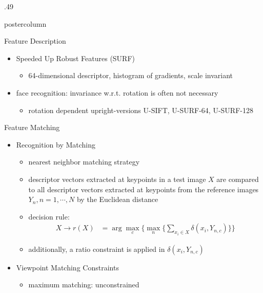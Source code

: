 \documentclass[final,hyperref={pdfpagelabels=false}]{beamer}
\begin{document}
\begin{frame}
\begin{columns}
\begin{column}{.49\textwidth}
\begin{beamercolorbox}[center,wd=\textwidth]{postercolumn}
\begin{minipage}[T]{.95\textwidth}
{\begin{block}{Feature Description}
\begin{itemize}
                \begin{itemize}
                \item 128-dimensional descriptor, histogram of gradients, scale invariant
                \end{itemize}
              \item Speeded Up Robust Features (SURF)
                \begin{itemize}
                \item 64-dimensional descriptor, histogram of gradients, scale invariant
                \end{itemize}
              \item face recognition: invariance w.r.t. rotation is often not necessary
                \begin{itemize}
                \item rotation dependent upright-versions U-SIFT, U-SURF-64, U-SURF-128
                \end{itemize}
              \end{itemize}
            \end{block}
            \vfill
            \begin{block}{Feature Matching}
              \begin{itemize}
              \item Recognition by Matching
                \begin{itemize}
                \item nearest neighbor matching strategy
                \item descriptor vectors extracted at keypoints in a test image $X$ are compared to all descriptor vectors extracted at keypoints from the reference images $Y_n, n=1,\cdots,N$ by the Euclidean distance
                \item decision rule:
                  \begin{align*}
                    X \rightarrow r(X) & = \arg \max_{c} \Big\{ \max_n \big\{ \sum_{x_i \in X} \delta(x_i,Y_{n,c})\big\} \Big\} 
                  \end{align*}
                \item additionally, a ratio constraint is applied in $\delta(x_i,Y_{n,c})$
                \end{itemize}
              \item Viewpoint Matching Constraints
                \begin{itemize}
                \item maximum matching: unconstrained

\end{itemize}
\end{itemize}
\end{block}}
\end{minipage}
\end{beamercolorbox}
\end{column}
\end{columns}
\end{frame}
\end{document}
